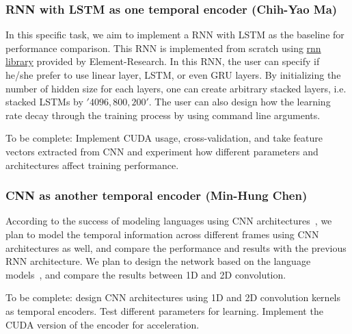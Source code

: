 \subsubsection*{RNN with LSTM as one temporal encoder (Chih-Yao Ma)}
In this specific task, we aim to implement a RNN with LSTM as the baseline for performance comparison. This RNN is implemented from scratch using \href{https://github.com/Element-Research/rnn}{rnn library} provided by Element-Research. In this RNN, the user can specify if he/she prefer to use linear layer, LSTM, or even GRU layers. By initializing the number of hidden size for each layers, one can create arbitrary stacked layers, i.e. stacked LSTMs by ${'4096, 800, 200'}$. The user can also design how the learning rate decay through the training process by using command line arguments. 

To be complete: Implement CUDA usage, cross-validation, and take feature vectors extracted from CNN and experiment how different parameters and architectures affect training performance. 

\subsubsection*{CNN as another temporal encoder (Min-Hung Chen)}
According to the success of modeling languages using CNN architectures~\cite{cnnSC,cnnMNLS}, we plan to model the temporal information across different frames using CNN architectures as well, and compare the performance and results with the previous RNN architecture. We plan to design the network based on the language models~\cite{cnnSC,cnnMNLS}, and compare the results between 1D and 2D convolution. 

To be complete: design CNN architectures using 1D and 2D convolution kernels as temporal encoders. Test different parameters for learning. Implement the CUDA version of the encoder for acceleration.

